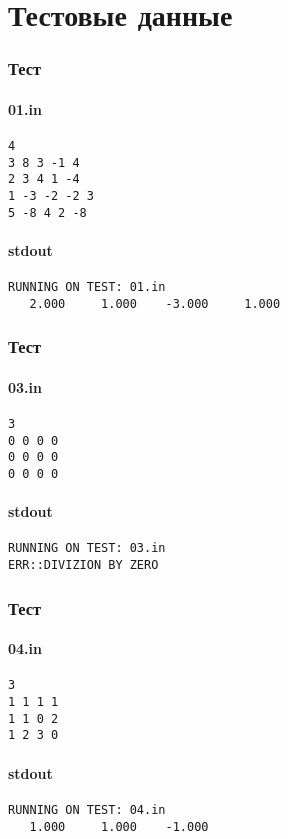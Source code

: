 \documentclass[a4paper,11pt]{article}
\begin{document}
\part{Тестовые данные}
\begin{footnotesize}
\section{Тест}
\subsection*{01.in}
\begin{lstlisting}
4
3 8 3 -1 4
2 3 4 1 -4
1 -3 -2 -2 3
5 -8 4 2 -8  
\end{lstlisting}
\subsection*{stdout}
\begin{lstlisting}
RUNNING ON TEST: 01.in
   2.000     1.000    -3.000     1.000 
\end{lstlisting}
\section{Тест}

\subsection*{03.in}
\begin{lstlisting}
3
0 0 0 0 
0 0 0 0
0 0 0 0
\end{lstlisting}
\subsection*{stdout}
\begin{lstlisting}
RUNNING ON TEST: 03.in
ERR::DIVIZION BY ZERO
\end{lstlisting}
\section{Тест}
\subsection*{04.in}
\begin{lstlisting}
3
1 1 1 1
1 1 0 2
1 2 3 0
\end{lstlisting}
\subsection*{stdout}
\begin{lstlisting}
RUNNING ON TEST: 04.in
   1.000     1.000    -1.000   
\end{lstlisting}

\end{footnotesize}
\end{document}

